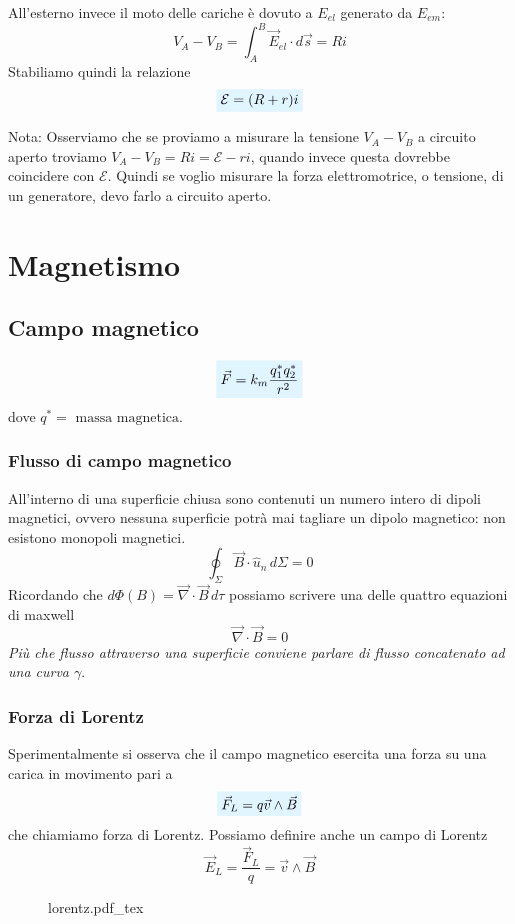 \documentclass[x11names]{report}
\newcommand{\nota}[2]{
	\begin{attenzione}{Nota:}
		#2
	\end{attenzione}
}
\newcommand{\incfig}[1]{%
	{#1.pdf_tex}
}
\newcommand{\viola}[1]{%
	\colorbox{myblue}{$\displaystyle #1$}
}
\begin{document}
All'esterno invece il moto delle cariche è dovuto a \(E_{el}\) generato da \(E_{em}\):
\[
V_A-V_B = \int_{A}^B\vec{E}_{el}\cdot d\vec{s} = Ri
\]
Stabiliamo quindi la relazione
\begin{equation}
	\viola{\mathcal{E} = (R+r)i}
\end{equation}
\nota{}{Osserviamo che se proviamo a misurare la tensione \(V_A-V_B\) a circuito aperto troviamo \(V_A-V_B = Ri =\mathcal{E}-ri\), quando invece questa dovrebbe coincidere con \(\mathcal{E}\). Quindi se voglio misurare la forza elettromotrice, o tensione, di un generatore, devo farlo a circuito aperto.}

\chapter{Magnetismo}


\section{Campo magnetico}


\begin{equation}
	\viola{\vec{F} = k_m\frac{q_{1}^{*}q_{2}^{*}}{r^2}}
\end{equation}
dove \(q^{*} = \text{ massa magnetica}\).

\subsection{Flusso di campo magnetico}
All'interno di una superficie chiusa sono contenuti un numero intero di dipoli magnetici, ovvero nessuna superficie potrà mai tagliare un dipolo magnetico: non esistono monopoli magnetici.
\[
\oint_\Sigma \vec{B}\cdot \hat{u}_n \, d\Sigma = 0
\]
Ricordando che \(d\Phi(B) = \vec{\nabla} \cdot \vec{B} \, d\tau\) possiamo scrivere una delle quattro equazioni di maxwell
\begin{equation}
	\vec{\nabla} \cdot \vec{B}  = 0
\end{equation}
\textit{Più che flusso attraverso una superficie conviene parlare di flusso concatenato ad una curva \(\gamma\)}.
\subsection{Forza di Lorentz}
Sperimentalmente si osserva che il campo magnetico esercita una forza su una carica in movimento pari a
\begin{equation}
	\viola{\vec{F}_L = q\vec{v} \wedge \vec{B}}
\end{equation}
che chiamiamo forza di Lorentz. Possiamo definire anche un campo di Lorentz
\[
\vec{E}_L = \frac{\vec{F}_L}{q} = \vec{v} \wedge \vec{B}
\]
\begin{figure}[H]
	\centering
	\incfig{lorentz}
\end{figure}
\end{document}
